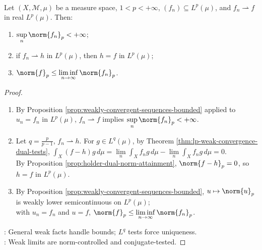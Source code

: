 \begin{proposition} \label{prop:lp-weak-limits-bounded-lsc} \\
Let $(X,\mathcal M,\mu)$ be a measure space, $1<p<+\infty$, $(f_n)\subseteq L^p(\mu)$, and $f_n\rightharpoonup f$ in real $L^p(\mu)$. Then:
\begin{enumerate}[label=(\roman*)]
\setlength{\itemsep}{0pt}
\item $\sup\limits_n\norm{f_n}_p<+\infty$;
\item if $f_n\rightharpoonup h$ in $L^p(\mu)$, then $h=f$ in $L^p(\mu)$;
\item $\norm{f}_p\leq\liminf\limits_{n\to\infty}\norm{f_n}_p$.
\end{enumerate}
\begin{proof}
\begin{enumerate}[label=(\roman*)]
\setlength{\itemsep}{0pt}
\item By Proposition \ref{prop:weakly-convergent-sequences-bounded} applied to $u_n=f_n$ in $L^p(\mu)$, $f_n\rightharpoonup f$ implies $\sup\limits_n\norm{f_n}_p<+\infty$.
\item Let $q=\frac{p}{p-1}$, $f_n\rightharpoonup h$. For $g\in L^q(\mu)$, by Theorem \ref{thm:lp-weak-convergence-dual-tests}, $\int_X(f-h)g\,d\mu=\lim\limits_n\int_Xf_ng\,d\mu-\lim\limits_n\int_Xf_ng\,d\mu=0$.\\
By Proposition \ref{prop:holder-dual-norm-attainment}, $\norm{f-h}_p=0$, so $h=f$ in $L^p(\mu)$.
\item By Proposition \ref{prop:weakly-convergent-sequences-bounded}, $u\mapsto\norm{u}_p$ is weakly lower semicontinuous on $L^p(\mu)$;\\
with $u_n=f_n$ and $u=f$, $\norm{f}_p\leq\liminf\limits_{n\to\infty}\norm{f_n}_p$.
\end{enumerate}
: General weak facts handle bounds; $L^q$ tests force uniqueness.\\
: Weak limits are norm-controlled and conjugate-tested.
\end{proof}
\end{proposition}

